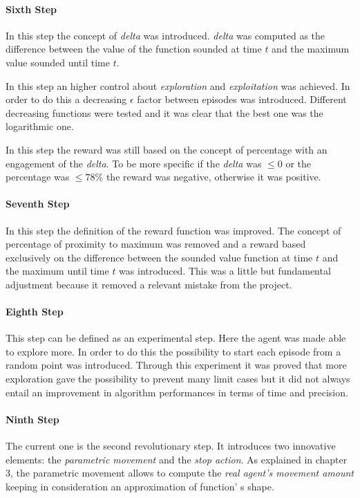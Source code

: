 \paragraph{Sixth Step} In this step the concept of \textit{delta} was introduced. \textit{delta} was computed as the difference between the value of the function sounded at time $t$ and the maximum value sounded until time $t$. 

In this step an higher control about \textit{exploration} and \textit{exploitation} was achieved. In order to do this a decreasing $\epsilon$ factor between episodes was introduced. Different decreasing functions were tested and it was clear that the best one was the logarithmic one. 

In this step the reward was still based on the concept of percentage with an engagement of the \textit{delta}. To be more specific if the \textit{delta} was $\le 0$ or the percentage was $\le 78\%$ the reward was negative, otherwise it was positive.

\paragraph{Seventh Step} In this step the definition of the reward function was improved. The concept of percentage of proximity to maximum was removed and a reward based exclusively on the difference between the sounded value function at time $t$ and the maximum until time $t$ was introduced. This was a little but fundamental adjustment because it removed a relevant mistake from the project.

\paragraph{Eighth Step} This step can be defined as an experimental step. Here the agent was made able to explore more. In order to do this the possibility to start each episode from a random point was introduced. Through this experiment it was proved that more exploration gave the possibility to prevent many limit cases but it did not always entail an improvement in algorithm performances in terms of time and precision.

\paragraph{Ninth Step} The current one is the second revolutionary step. It introduces two innovative elements: the \textit{parametric movement} and the \textit{stop action}.
As explained in chapter $3$, the parametric movement allows to compute the \textit{real agent's movement amount} keeping in consideration an approximation of function' s shape.

